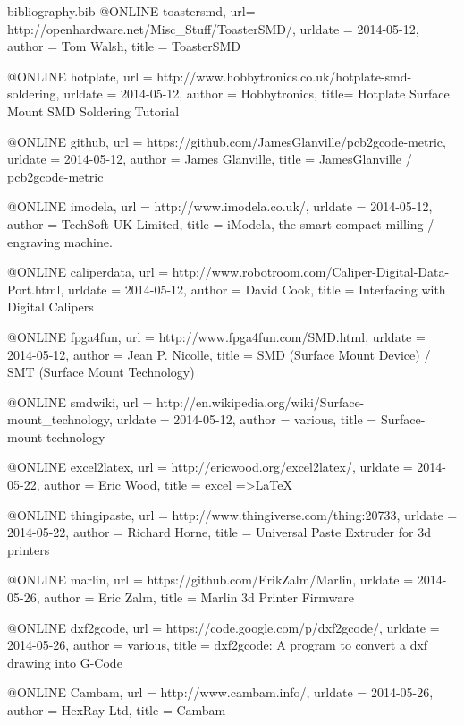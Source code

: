 
\begin{filecontents}{bibliography.bib}
@ONLINE {toastersmd,
    url= {http://openhardware.net/Misc_Stuff/ToasterSMD/},
    urldate = {2014-05-12},
    author = {Tom Walsh},
    title = {ToasterSMD}}
    
@ONLINE {hotplate,
	url = {http://www.hobbytronics.co.uk/hotplate-smd-soldering},
	urldate = {2014-05-12},
	author = {Hobbytronics},
	title= {Hotplate Surface Mount SMD Soldering Tutorial}}
	
@ONLINE {github,
	url = {https://github.com/JamesGlanville/pcb2gcode-metric},
	urldate = {2014-05-12},
	author = {James Glanville},
	title = {JamesGlanville / pcb2gcode-metric}}
	
@ONLINE {imodela,
	url = {http://www.imodela.co.uk/},
	urldate = {2014-05-12},
	author = {TechSoft UK Limited},
	title = {iModela, the smart compact milling / engraving machine.}}
	
@ONLINE {caliperdata,
	url = {http://www.robotroom.com/Caliper-Digital-Data-Port.html},
	urldate = {2014-05-12},
	author = {David Cook},
	title = {Interfacing with Digital Calipers}}
	
@ONLINE {fpga4fun,
	url = {http://www.fpga4fun.com/SMD.html},
	urldate = {2014-05-12},
	author = {Jean P. Nicolle},
	title = {SMD (Surface Mount Device) / SMT (Surface Mount Technology)}}
	
@ONLINE {smdwiki,
	url = {http://en.wikipedia.org/wiki/Surface-mount_technology},
	urldate = {2014-05-12},
	author = {various},
	title = {Surface-mount technology}}
	
@ONLINE {excel2latex,
	url = {http://ericwood.org/excel2latex/},
	urldate = {2014-05-22},
	author = {Eric Wood},
	title = {excel =\textgreater LaTeX}}
	
@ONLINE {thingipaste,
	url = {http://www.thingiverse.com/thing:20733},
	urldate = {2014-05-22},
	author = {Richard Horne},
	title = {Universal Paste Extruder for 3d printers}}
	
@ONLINE {marlin,
	url = {https://github.com/ErikZalm/Marlin},
	urldate = {2014-05-26},
	author = {Eric Zalm},
	title = {Marlin 3d Printer Firmware}}
	
@ONLINE {dxf2gcode,
	url = {https://code.google.com/p/dxf2gcode/},
	urldate = {2014-05-26},
	author = {various},
	title = {dxf2gcode: A program to convert a dxf drawing into G-Code}}
	
@ONLINE {Cambam,
	url = {http://www.cambam.info/},
	urldate = {2014-05-26},
	author = {HexRay Ltd},
	title = {Cambam}}
\end{filecontents}

